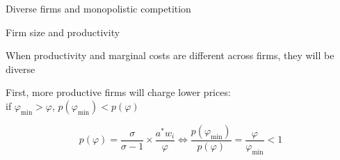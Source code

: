\documentclass[notes,11pt, aspectratio=169, xcolor=table]{beamer}
\newenvironment{wideitemize}{\itemize\addtolength{\itemsep}{10pt}}{\enditemize}
\begin{document}
\begin{frame}{Diverse firms and monopolistic competition}

 \end{frame}



\begin{frame}{Firm size and productivity}

    \begin{wideitemize}
        \item When productivity and marginal costs are different across firms, they will be diverse

        \item First, more productive firms will charge lower prices: \\
        \qquad if $\varphi_{\min}>\varphi$, $p(\varphi_{\min})<p(\varphi)$

        \begin{equation*}
            p(\varphi) = \frac{\sigma}{\sigma -1}\times \frac{a^* w_i}{\varphi} \iff \frac{p(\varphi_{\min})}{p(\varphi)} = \frac{\varphi}{\varphi_{\min}} < 1
        \end{equation*}

    \end{wideitemize}
\end{frame}
\end{document}
